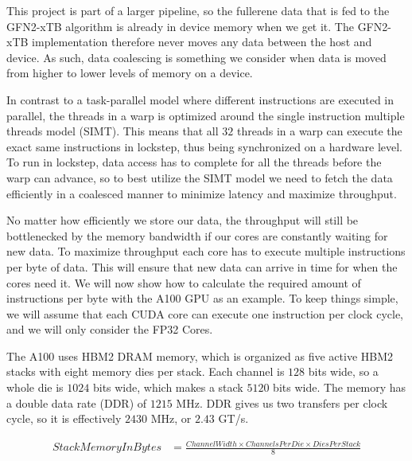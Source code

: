 This project is part of a larger pipeline, so the fullerene data that is fed to the GFN2-xTB algorithm is already in device memory when we get it. The GFN2-xTB implementation therefore never moves any data between the host and device. As such, data coalescing is something we consider when data is moved from higher to lower levels of memory on a device.

In contrast to a task-parallel model where different instructions are executed in parallel, the threads in a warp is optimized around the single instruction multiple threads model (SIMT). This means that all $32$ threads in a warp can execute the exact same instructions in lockstep, thus being synchronized on a hardware level. To run in lockstep, data access has to complete for all the threads before the warp can advance, so to best utilize the SIMT model we need to fetch the data efficiently in a coalesced manner to minimize latency and maximize throughput.

No matter how efficiently we store our data, the throughput will still be bottlenecked by the memory bandwidth if our cores are constantly waiting for new data. To maximize throughput each core has to execute multiple instructions per byte of data. This will ensure that new data can arrive in time for when the cores need it. We will now show how to calculate the required amount of instructions per byte with the A100 GPU as an example. To keep things simple, we will assume that each CUDA core can execute one instruction per clock cycle, and we will only consider the FP32 Cores.

The A100 uses HBM2 DRAM memory, which is organized as five active HBM2 stacks with eight memory dies per stack. Each channel is $128$ bits wide, so a whole die is $1024$ bits wide, which makes a stack $5120$ bits wide. The memory has a double data rate (DDR) of $1215$ MHz. DDR gives us two transfers per clock cycle, so it is effectively $2430$ MHz, or $2.43$ GT/s.

\begin{equation}
\begin{split}
        StackMemoryInBytes &= \frac{ChannelWidth \times ChannelsPerDie \times DiesPerStack}{8}\\
\end{split}
\end{equation}

